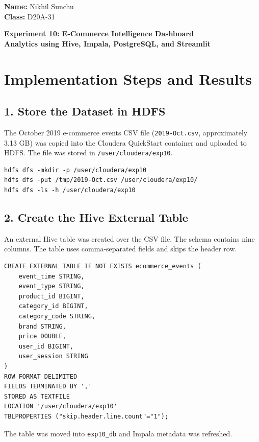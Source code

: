 \documentclass[11pt,a4paper]{article}
\begin{document}
\noindent
\textbf{Name:} Nikhil Sunchu\\
\textbf{Class:} D20A-31

\vspace{0.5em}
\begin{center}
{\Large\bfseries Experiment 10: E-Commerce Intelligence Dashboard}\\
\textbf{Analytics using Hive, Impala, PostgreSQL, and Streamlit}
\end{center}

\section{Implementation Steps and Results}

\subsection{1. Store the Dataset in HDFS}
The October 2019 e-commerce events CSV file (\texttt{2019-Oct.csv}, approximately 3.13 GB) was copied into the Cloudera QuickStart container and uploaded to HDFS. The file was stored in \texttt{/user/cloudera/exp10}.

\begin{lstlisting}[style=terminalstyle]
hdfs dfs -mkdir -p /user/cloudera/exp10
hdfs dfs -put /tmp/2019-Oct.csv /user/cloudera/exp10/
hdfs dfs -ls -h /user/cloudera/exp10
\end{lstlisting}

\subsection{2. Create the Hive External Table}
An external Hive table was created over the CSV file. The schema contains nine columns. The table uses comma-separated fields and skips the header row.

\begin{lstlisting}[style=terminalstyle]
CREATE EXTERNAL TABLE IF NOT EXISTS ecommerce_events (
    event_time STRING,
    event_type STRING,
    product_id BIGINT,
    category_id BIGINT,
    category_code STRING,
    brand STRING,
    price DOUBLE,
    user_id BIGINT,
    user_session STRING
)
ROW FORMAT DELIMITED
FIELDS TERMINATED BY ','
STORED AS TEXTFILE
LOCATION '/user/cloudera/exp10'
TBLPROPERTIES ("skip.header.line.count"="1");
\end{lstlisting}

The table was moved into \texttt{exp10\_db} and Impala metadata was refreshed.
\end{document}
